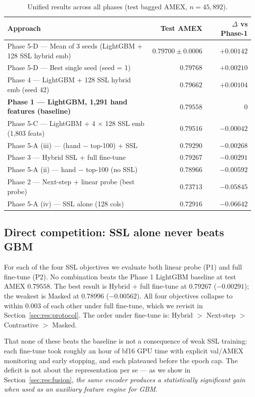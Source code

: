 \documentclass[sigconf, anonymous, review]{acmart}
\begin{document}
\begin{table}[t]
\centering
\caption{Unified results across all phases (test bagged AMEX,
$n = 45{,}892$).}
\label{tab:unified}
\small
\begin{tabular}{l r r}
\toprule
Approach & Test AMEX & $\Delta$ vs Phase-1 \\
\midrule
Phase 5-D --- Mean of 3 seeds (LightGBM + 128 SSL hybrid emb) & $\mathbf{0.79700 \pm 0.0006}$ & $\mathbf{+0.00142}$ \\
Phase 5-D --- Best single seed (seed = 1) & $0.79768$ & $+0.00210$ \\
Phase 4 --- LightGBM + 128 SSL hybrid emb (seed 42) & $0.79662$ & $+0.00104$ \\
\textbf{Phase 1 --- LightGBM, 1{,}291 hand features (baseline)} & $\mathbf{0.79558}$ & $0$ \\
Phase 5-C --- LightGBM + 4 $\times$ 128 SSL emb (1{,}803 feats) & $0.79516$ & $-0.00042$ \\
Phase 5-A (iii) --- (hand $-$ top-100) + SSL & $0.79290$ & $-0.00268$ \\
Phase 3 --- Hybrid SSL + full fine-tune & $0.79267$ & $-0.00291$ \\
Phase 5-A (ii) --- hand $-$ top-100 (no SSL) & $0.78966$ & $-0.00592$ \\
Phase 2 --- Next-step + linear probe (best probe) & $0.73713$ & $-0.05845$ \\
Phase 5-A (iv) --- SSL alone (128 cols) & $0.72916$ & $-0.06642$ \\
\bottomrule
\end{tabular}
\end{table}

\subsection{Direct competition: SSL alone never beats GBM}
\label{sec:res:direct}

For each of the four SSL objectives we evaluate both linear probe (P1)
and full fine-tune (P2). No combination beats the Phase 1 LightGBM
baseline at test AMEX $0.79558$. The best result is Hybrid + full
fine-tune at $0.79267$ ($-0.00291$); the weakest is Masked at
$0.78996$ ($-0.00562$). All four objectives collapse to within $0.003$
of each other under full fine-tune, which we revisit in
Section~\ref{sec:res:protocol}. The order under fine-tune is:
Hybrid $>$ Next-step $>$ Contrastive $>$ Masked.

That none of these beats the baseline is not a consequence of weak
SSL training: each fine-tune took roughly an hour of bf16 GPU time
with explicit val/AMEX monitoring and early stopping, and each
plateaued before the epoch cap. The deficit is not about the
representation per se --- as we show in Section~\ref{sec:res:fusion},
\emph{the same encoder produces a statistically significant gain
when used as an auxiliary feature engine for GBM}.
\end{document}
